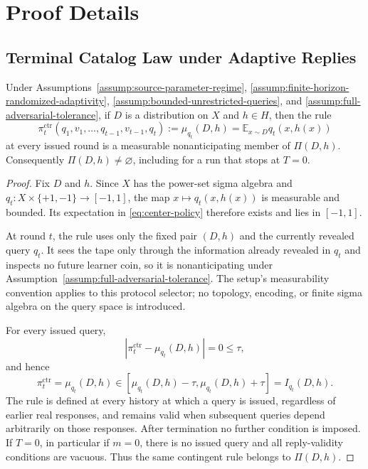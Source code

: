 \appendix

\section{Proof Details}\label{sec:proof-details}

\subsection{Terminal Catalog Law under Adaptive Replies}
\label{app:terminal-catalog-law}

\begin{proposition}
\label{prop:step-001-center-policy}
Under Assumptions~\ref{assump:source-parameter-regime},
\ref{assump:finite-horizon-randomized-adaptivity},
\ref{assump:bounded-unrestricted-queries}, and
\ref{assump:full-adversarial-tolerance}, if $D$ is a distribution on $X$ and
$h\in H$, then the rule
\begin{equation}\label{eq:center-policy}
\pi_t^{\mathrm{ctr}}
(q_1,v_1,\ldots,q_{t-1},v_{t-1},q_t)
:=\mu_{q_t}(D,h)
=\mathbb E_{x\sim D}q_t(x,h(x))
\end{equation}
at every issued round is a measurable nonanticipating member of
$\Pi(D,h)$.  Consequently $\Pi(D,h)\ne\varnothing$, including for a run
that stops at $T=0$.
\end{proposition}

\begin{proof}
Fix $D$ and $h$.  Since $X$ has the power-set sigma algebra and
$q_t:X\times\{+1,-1\}\to[-1,1]$, the map
$x\mapsto q_t(x,h(x))$ is measurable and bounded.  Its expectation in
\eqref{eq:center-policy} therefore exists and lies in $[-1,1]$.

At round $t$, the rule uses only the fixed pair $(D,h)$ and the currently
revealed query $q_t$.  It sees the tape only through the information already
revealed in $q_t$ and inspects no future learner coin, so it is
nonanticipating under Assumption~\ref{assump:full-adversarial-tolerance}.
The setup's measurability convention applies to this protocol selector; no
topology, encoding, or finite sigma algebra on the query space is introduced.

For every issued query,
\[
\left|\pi_t^{\mathrm{ctr}}-\mu_{q_t}(D,h)\right|=0\le\tau,
\]
and hence
\[
\pi_t^{\mathrm{ctr}}=\mu_{q_t}(D,h)
\in[\mu_{q_t}(D,h)-\tau,\mu_{q_t}(D,h)+\tau]
=I_{q_t}(D,h).
\]
The rule is defined at every history at which a query is issued, regardless
of earlier real responses, and remains valid when subsequent queries depend
arbitrarily on those responses.  After termination no further condition is
imposed.  If $T=0$, in particular if $m=0$, there is no issued query and all
reply-validity conditions are vacuous.  Thus the same contingent rule belongs
to $\Pi(D,h)$.
\end{proof}


